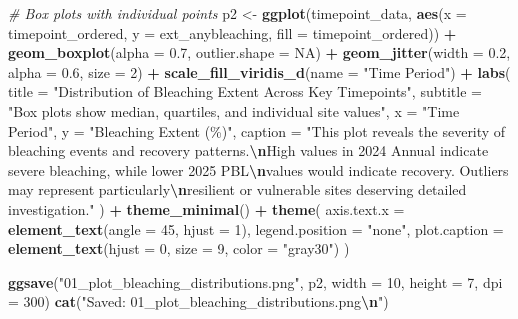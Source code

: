 \documentclass[
]{article}
\newenvironment{Shaded}{\begin{snugshade}}{\end{snugshade}}
\newcommand{\AttributeTok}[1]{\textcolor[rgb]{0.13,0.29,0.53}{#1}}
\newcommand{\CommentTok}[1]{\textcolor[rgb]{0.56,0.35,0.01}{\textit{#1}}}
\newcommand{\ConstantTok}[1]{\textcolor[rgb]{0.56,0.35,0.01}{#1}}
\newcommand{\DecValTok}[1]{\textcolor[rgb]{0.00,0.00,0.81}{#1}}
\newcommand{\FloatTok}[1]{\textcolor[rgb]{0.00,0.00,0.81}{#1}}
\newcommand{\FunctionTok}[1]{\textcolor[rgb]{0.13,0.29,0.53}{\textbf{#1}}}
\newcommand{\NormalTok}[1]{#1}
\newcommand{\OtherTok}[1]{\textcolor[rgb]{0.56,0.35,0.01}{#1}}
\newcommand{\SpecialCharTok}[1]{\textcolor[rgb]{0.81,0.36,0.00}{\textbf{#1}}}
\newcommand{\StringTok}[1]{\textcolor[rgb]{0.31,0.60,0.02}{#1}}
\begin{document}
\begin{Shaded}
\begin{Highlighting}[]
\CommentTok{\# Box plots with individual points}
\NormalTok{p2 }\OtherTok{\textless{}{-}} \FunctionTok{ggplot}\NormalTok{(timepoint\_data, }\FunctionTok{aes}\NormalTok{(}\AttributeTok{x =}\NormalTok{ timepoint\_ordered, }\AttributeTok{y =}\NormalTok{ ext\_anybleaching, }\AttributeTok{fill =}\NormalTok{ timepoint\_ordered)) }\SpecialCharTok{+}
  \FunctionTok{geom\_boxplot}\NormalTok{(}\AttributeTok{alpha =} \FloatTok{0.7}\NormalTok{, }\AttributeTok{outlier.shape =} \ConstantTok{NA}\NormalTok{) }\SpecialCharTok{+}
  \FunctionTok{geom\_jitter}\NormalTok{(}\AttributeTok{width =} \FloatTok{0.2}\NormalTok{, }\AttributeTok{alpha =} \FloatTok{0.6}\NormalTok{, }\AttributeTok{size =} \DecValTok{2}\NormalTok{) }\SpecialCharTok{+}
  \FunctionTok{scale\_fill\_viridis\_d}\NormalTok{(}\AttributeTok{name =} \StringTok{"Time Period"}\NormalTok{) }\SpecialCharTok{+}
  \FunctionTok{labs}\NormalTok{(}
    \AttributeTok{title =} \StringTok{"Distribution of Bleaching Extent Across Key Timepoints"}\NormalTok{,}
    \AttributeTok{subtitle =} \StringTok{"Box plots show median, quartiles, and individual site values"}\NormalTok{,}
    \AttributeTok{x =} \StringTok{"Time Period"}\NormalTok{,}
    \AttributeTok{y =} \StringTok{"Bleaching Extent (\%)"}\NormalTok{,}
    \AttributeTok{caption =} \StringTok{"This plot reveals the severity of bleaching events and recovery patterns.}\SpecialCharTok{\textbackslash{}n}\StringTok{High values in 2024 Annual indicate severe bleaching, while lower 2025 PBL}\SpecialCharTok{\textbackslash{}n}\StringTok{values would indicate recovery. Outliers may represent particularly}\SpecialCharTok{\textbackslash{}n}\StringTok{resilient or vulnerable sites deserving detailed investigation."}
\NormalTok{  ) }\SpecialCharTok{+}
  \FunctionTok{theme\_minimal}\NormalTok{() }\SpecialCharTok{+}
  \FunctionTok{theme}\NormalTok{(}
    \AttributeTok{axis.text.x =} \FunctionTok{element\_text}\NormalTok{(}\AttributeTok{angle =} \DecValTok{45}\NormalTok{, }\AttributeTok{hjust =} \DecValTok{1}\NormalTok{),}
    \AttributeTok{legend.position =} \StringTok{"none"}\NormalTok{,}
    \AttributeTok{plot.caption =} \FunctionTok{element\_text}\NormalTok{(}\AttributeTok{hjust =} \DecValTok{0}\NormalTok{, }\AttributeTok{size =} \DecValTok{9}\NormalTok{, }\AttributeTok{color =} \StringTok{"gray30"}\NormalTok{)}
\NormalTok{  )}

\FunctionTok{ggsave}\NormalTok{(}\StringTok{"01\_plot\_bleaching\_distributions.png"}\NormalTok{, p2, }\AttributeTok{width =} \DecValTok{10}\NormalTok{, }\AttributeTok{height =} \DecValTok{7}\NormalTok{, }\AttributeTok{dpi =} \DecValTok{300}\NormalTok{)}
\FunctionTok{cat}\NormalTok{(}\StringTok{"Saved: 01\_plot\_bleaching\_distributions.png}\SpecialCharTok{\textbackslash{}n}\StringTok{"}\NormalTok{)}
\end{Highlighting}
\end{Shaded}
\end{document}
